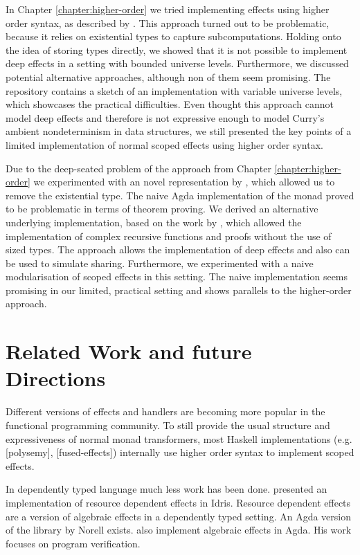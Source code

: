 \documentclass[10pt,a4paper,twoside,notitlepage]{report}
\begin{document}
In Chapter \ref{chapter:higher-order} we tried implementing effects using higher
order syntax, as described by \textcite{DBLP:conf/haskell/WuSH14}.
This approach turned out to be problematic, because it relies on existential
types to capture subcomputations.
Holding onto the idea of storing types directly, we showed that it is not
possible to implement deep effects in a setting with bounded universe levels.
Furthermore, we discussed potential alternative approaches, although non of them
seem promising.
The repository contains a sketch of an implementation with variable universe
levels, which showcases the practical difficulties.
Even thought this approach cannot model deep effects and therefore is not
expressive enough to model Curry's ambient nondeterminism in data structures, we
still presented the key points of a limited implementation of normal scoped
effects using higher order syntax.

Due to the deep-seated problem of the approach from Chapter
\ref{chapter:higher-order} we experimented with an novel representation by
\textcite{DBLP:conf/lics/PirogSWJ18}, which allowed us to remove the existential
type.
The naive Agda implementation of the monad \textcite{DBLP:conf/lics/PirogSWJ18}
proved to be problematic in terms of theorem proving.
We derived an alternative underlying implementation, based on the work by
\textcite{DBLP:journals/corr/abs-1806-05230}, which allowed the implementation
of complex recursive functions and proofs without the use of sized types.
The approach allows the implementation of deep effects and also can be used to
simulate sharing.
Furthermore, we experimented with a naive modularisation of scoped effects in
this setting.
The naive implementation seems promising in our limited, practical
setting and shows parallels to the higher-order approach. %


\section{Related Work and future Directions}

Different versions of effects and handlers are becoming more popular in the
functional programming community.
To still provide the usual structure and expressiveness of normal monad
transformers, most Haskell implementations (e.g. [polysemy], [fused-effects])
internally use higher order syntax to implement scoped effects.

In dependently typed language much less work has been done.
\textcite{DBLP:conf/icfp/Brady13} presented an implementation of resource
dependent effects in Idris.
Resource dependent effects are a version of algebraic effects in a dependently
typed setting.
An Agda version of the library by Norell exists.
\textcite{baanen2019algebraic} also implement algebraic effects in Agda.
His work focuses on program verification.
\end{document}
